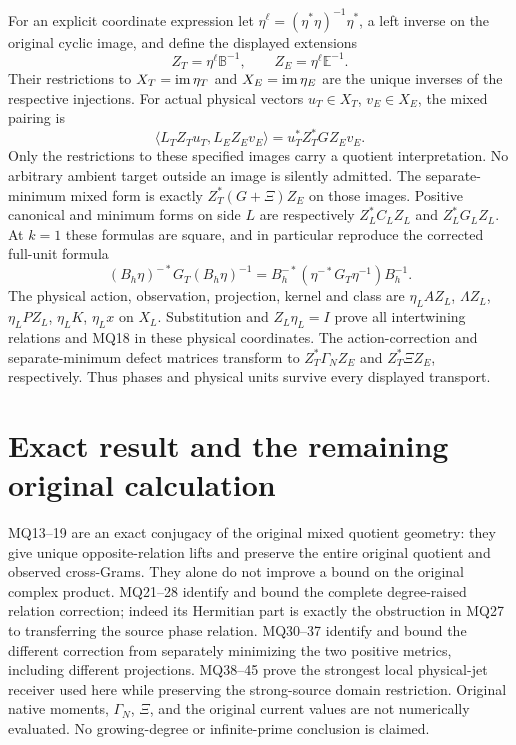 For an explicit coordinate expression let
$\eta^\ell=(\eta^*\eta)^{-1}\eta^*$, a left inverse on the
original cyclic image, and define the displayed extensions
\[
 Z_T=\eta^\ell\mathbb B^{-1},\qquad
 Z_E=\eta^\ell\mathbb E^{-1}.                               \tag{MQ43}
\]
Their restrictions to $X_T=\operatorname{im}\eta_T$ and $X_E=\operatorname{im}\eta_E$
are the unique inverses of the respective injections. For actual
physical vectors $u_T\in X_T$, $v_E\in X_E$, the mixed pairing is
\[
 \langle L_TZ_Tu_T,L_EZ_Ev_E\rangle
       =u_T^* Z_T^*G Z_Ev_E.                               \tag{MQ44}
\]
Only the restrictions to these specified images carry a quotient
interpretation. No arbitrary ambient target outside an image is
silently admitted. The separate-minimum mixed form is exactly
$Z_T^*(G+\Xi)Z_E$ on those images. Positive canonical and minimum
forms on side $L$ are respectively $Z_L^*C_LZ_L$ and
$Z_L^*G_LZ_L$. At $k=1$ these formulas are square, and in
particular reproduce the corrected full-unit formula
\[
 (B_h\eta)^{-*}G_T(B_h\eta)^{-1}
   =B_h^{-*}(\eta^{-*}G_T\eta^{-1})B_h^{-1}.                \tag{MQ45}
\]
The physical action, observation, projection, kernel and class are
$\eta_L A Z_L$, $\Lambda Z_L$, $\eta_LPZ_L$, $\eta_LK$,
$\eta_Lx$ on $X_L$. Substitution and $Z_L\eta_L=I$ prove
all intertwining relations and MQ18 in these physical coordinates.
The action-correction and separate-minimum defect matrices transform
to $Z_T^*\Gamma_NZ_E$ and $Z_T^*\Xi Z_E$, respectively.
Thus phases and physical units survive every displayed transport.

\section{Exact result and the remaining original calculation}
MQ13--19 are an exact conjugacy of the original mixed quotient
geometry: they give unique opposite-relation lifts and preserve the
entire original quotient and observed cross-Grams. They alone do
not improve a bound on the original complex product. MQ21--28
identify and bound the complete degree-raised relation correction;
indeed its Hermitian part is exactly the obstruction in MQ27 to
transferring the source phase relation. MQ30--37 identify and bound
the different correction from separately minimizing the two
positive metrics, including different projections. MQ38--45 prove
the strongest local physical-jet receiver used here while preserving
the strong-source domain restriction. Original native moments,
$\Gamma_N$, $\Xi$, and the original current values are not numerically
evaluated. No growing-degree or infinite-prime conclusion is claimed.

